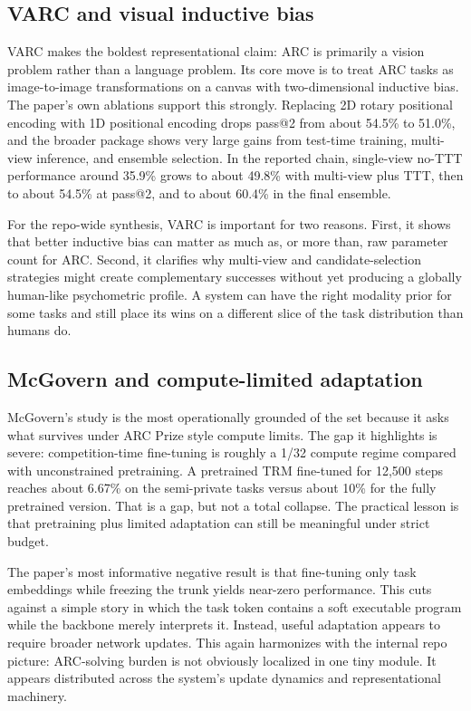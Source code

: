 \documentclass[11pt,letterpaper]{article}
\begin{document}
\subsection{VARC and visual inductive bias}

VARC makes the boldest representational claim: ARC is primarily a vision problem rather than a language problem. Its core move is to treat ARC tasks as image-to-image transformations on a canvas with two-dimensional inductive bias. The paper's own ablations support this strongly. Replacing 2D rotary positional encoding with 1D positional encoding drops pass@2 from about 54.5\% to 51.0\%, and the broader package shows very large gains from test-time training, multi-view inference, and ensemble selection. In the reported chain, single-view no-TTT performance around 35.9\% grows to about 49.8\% with multi-view plus TTT, then to about 54.5\% at pass@2, and to about 60.4\% in the final ensemble.

For the repo-wide synthesis, VARC is important for two reasons. First, it shows that better inductive bias can matter as much as, or more than, raw parameter count for ARC. Second, it clarifies why multi-view and candidate-selection strategies might create complementary successes without yet producing a globally human-like psychometric profile. A system can have the right modality prior for some tasks and still place its wins on a different slice of the task distribution than humans do.

\subsection{McGovern and compute-limited adaptation}

McGovern's study is the most operationally grounded of the set because it asks what survives under ARC Prize style compute limits. The gap it highlights is severe: competition-time fine-tuning is roughly a 1/32 compute regime compared with unconstrained pretraining. A pretrained TRM fine-tuned for 12,500 steps reaches about 6.67\% on the semi-private tasks versus about 10\% for the fully pretrained version. That is a gap, but not a total collapse. The practical lesson is that pretraining plus limited adaptation can still be meaningful under strict budget.

The paper's most informative negative result is that fine-tuning only task embeddings while freezing the trunk yields near-zero performance. This cuts against a simple story in which the task token contains a soft executable program while the backbone merely interprets it. Instead, useful adaptation appears to require broader network updates. This again harmonizes with the internal repo picture: ARC-solving burden is not obviously localized in one tiny module. It appears distributed across the system's update dynamics and representational machinery.
\end{document}
